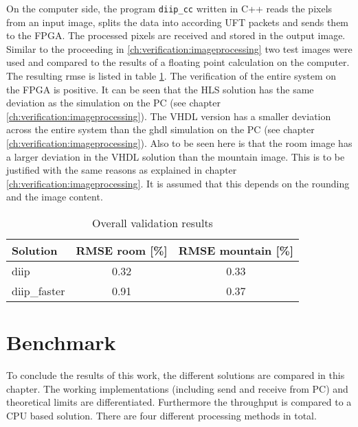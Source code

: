 On the computer side, the program \texttt{diip\_cc} written in C++ reads the
pixels from an input image, splits the data into according UFT packets and sends
them to the FPGA. The processed pixels are received and stored in the output
image. Similar to the proceeding in \ref{ch:verification:imageprocessing} two
test images were used and compared to the results of a floating point
calculation on the computer. The resulting \gls{rmse} is listed in table 
\ref{tab:overallvalidationresults}. The verification of the entire system on
the FPGA is positive. It can be seen that the HLS solution has the same
deviation as the simulation on the PC (see chapter 
\ref{ch:verification:imageprocessing}). The VHDL version has a smaller
deviation across the entire system than the \gls{ghdl} simulation on the PC (see
chapter \ref{ch:verification:imageprocessing}). Also to be seen here is that
the room image has a larger deviation in the VHDL solution than the
mountain image. This is to be justified with the same reasons as explained in
chapter \ref{ch:verification:imageprocessing}. It is assumed that this depends on the rounding and the image content. 


\begin{table}[tb!] \centering \begin{tabular}{l c c}
        \toprule
        Solution            & RMSE room [\%]    & RMSE mountain [\%]\\
        \midrule
        diip         & 0.32             & 0.33 \\
        diip\_faster & 0.91             & 0.37 \\
        \bottomrule
    \end{tabular}
    \caption{Overall validation results}
    \label{tab:overallvalidationresults}
\end{table}


%
%
\section{Benchmark}\label{ch:benchmark}
To conclude the results of this work, the different solutions are compared in
this chapter. The working implementations (including send and receive from PC)
and theoretical limits are differentiated. Furthermore the throughput is
compared to a CPU based solution.
There are four different processing methods in total.

